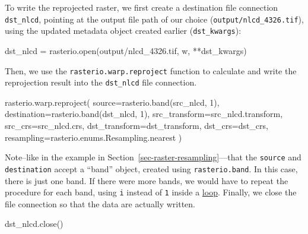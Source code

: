 \documentclass[
  letterpaper,
]{krantz}
\newenvironment{Shaded}{\begin{snugshade}}{\end{snugshade}}
\newcommand{\BuiltInTok}[1]{\textcolor[rgb]{0.00,0.23,0.31}{#1}}
\newcommand{\DecValTok}[1]{\textcolor[rgb]{0.68,0.00,0.00}{#1}}
\newcommand{\NormalTok}[1]{\textcolor[rgb]{0.00,0.23,0.31}{#1}}
\newcommand{\OperatorTok}[1]{\textcolor[rgb]{0.37,0.37,0.37}{#1}}
\newcommand{\StringTok}[1]{\textcolor[rgb]{0.13,0.47,0.30}{#1}}
\begin{document}
To write the reprojected raster, we first create a destination file
connection \texttt{dst\_nlcd}, pointing at the output file path of our
choice
(\texttt{\textquotesingle{}output/nlcd\_4326.tif\textquotesingle{}}),
using the updated metadata object created earlier
(\texttt{dst\_kwargs}):

\begin{Shaded}
\begin{Highlighting}[]
\NormalTok{dst\_nlcd }\OperatorTok{=}\NormalTok{ rasterio.}\BuiltInTok{open}\NormalTok{(}\StringTok{\textquotesingle{}output/nlcd\_4326.tif\textquotesingle{}}\NormalTok{, }\StringTok{\textquotesingle{}w\textquotesingle{}}\NormalTok{, }\OperatorTok{**}\NormalTok{dst\_kwargs)}
\end{Highlighting}
\end{Shaded}

Then, we use the \texttt{rasterio.warp.reproject} function to calculate
and write the reprojection result into the \texttt{dst\_nlcd} file
connection.

\begin{Shaded}
\begin{Highlighting}[]
\NormalTok{rasterio.warp.reproject(}
\NormalTok{    source}\OperatorTok{=}\NormalTok{rasterio.band(src\_nlcd, }\DecValTok{1}\NormalTok{),}
\NormalTok{    destination}\OperatorTok{=}\NormalTok{rasterio.band(dst\_nlcd, }\DecValTok{1}\NormalTok{),}
\NormalTok{    src\_transform}\OperatorTok{=}\NormalTok{src\_nlcd.transform,}
\NormalTok{    src\_crs}\OperatorTok{=}\NormalTok{src\_nlcd.crs,}
\NormalTok{    dst\_transform}\OperatorTok{=}\NormalTok{dst\_transform,}
\NormalTok{    dst\_crs}\OperatorTok{=}\NormalTok{dst\_crs,}
\NormalTok{    resampling}\OperatorTok{=}\NormalTok{rasterio.enums.Resampling.nearest}
\NormalTok{)}
\end{Highlighting}
\end{Shaded}

Note--like in the example in Section~\ref{sec-raster-resampling}---that
the \texttt{source} and \texttt{destination} accept a ``band'' object,
created using \texttt{rasterio.band}. In this case, there is just one
band. If there were more bands, we would have to repeat the procedure
for each band, using \texttt{i} instead of \texttt{1} inside a
\href{https://rasterio.readthedocs.io/en/latest/topics/reproject.html\#reprojecting-a-geotiff-dataset}{loop}.
Finally, we close the file connection so that the data are actually
written.

\begin{Shaded}
\begin{Highlighting}[]
\NormalTok{dst\_nlcd.close()}
\end{Highlighting}
\end{Shaded}
\end{document}
